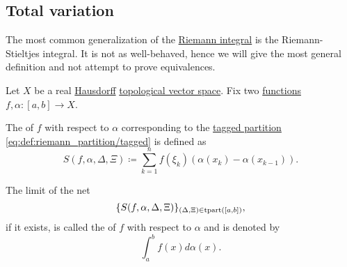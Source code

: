 \subsection{Total variation}\label{subsec:total_variation}

\begin{definition}\label{def:riemann_stieltjes_integral}
  The most common generalization of the \hyperref[def:riemann_integral]{Riemann integral} is the Riemann-Stieltjes integral. It is not as well-behaved, hence we will give the most general definition and not attempt to prove equivalences.

  Let \( X \) be a real \hyperref[def:separation_axioms/T2]{Hausdorff} \hyperref[def:topological_vector_space]{topological vector space}. Fix two \hyperref[def:function]{functions} \( f, \alpha: [a, b] \to X \).

  The  of \( f \) with respect to \( \alpha \) corresponding to the \hyperref[def:riemann_partition/tagged]{tagged partition} \eqref{eq:def:riemann_partition/tagged} is defined as
  \begin{equation*}
    S(f, \alpha, \Delta, \Xi) \coloneqq \sum_{k=1}^n f(\xi_k) (\alpha(x_k) - \alpha(x_{k-1})).
  \end{equation*}

  The limit of the net
  \begin{equation}\label{eq:def:riemann_stieltjes_integral/net}
    \{ S(f, \alpha, \Delta, \Xi) \}_{(\Delta, \Xi) \in \operatorname{tpart}([a, b])},
  \end{equation}
  if it exists, is called the  of \( f \) with respect to \( \alpha \) and is denoted by
  \begin{equation*}
    \int_a^b f(x) d \alpha(x).
  \end{equation*}
\end{definition}
